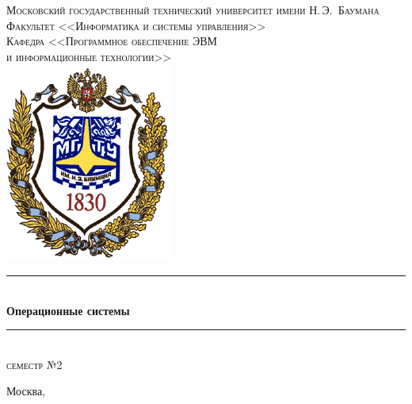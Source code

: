 \newcommand{\HRule}{\rule{\linewidth}{0.5mm}}

\begin{center}

\textsc{\large Московский государственный технический университет имени Н.\,Э.~Баумана}\\[0.5cm]
\textsc{Факультет <<Информатика и системы управления>>}\\
\textsc{Кафедра <<Программное обеспечение ЭВМ\\и информационные технологии>>}\\[0.25cm]

\includegraphics[scale=0.5]{assets/bmstu-logo.png}~\\[2.25cm]

\HRule \\[0.5cm]
{\huge \bfseries Операционные системы}
\HRule \\[0.5cm]
\textsc{\large семестр №2}\\

\vfill


{\large Москва, \the\year}

\end{center}

\newpage
{}